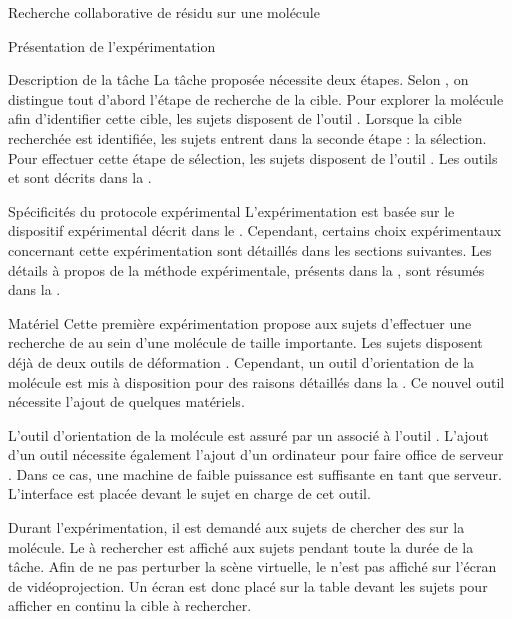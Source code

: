 \documentclass[myfrancais,ngerman,english,frenchb]{mythesis}
\begin{document}
\begin{mychapter}{Recherche collaborative de résidu sur une molécule}
\begin{mysection}{Présentation de l'expérimentation}
\begin{mysubsection}{Description de la tâche}
				La tâche proposée nécessite deux étapes.
				Selon , on distingue tout d'abord l'étape de recherche de la cible.
				Pour explorer la molécule afin d'identifier cette cible, les sujets disposent de l'outil .
				Lorsque la cible recherchée est identifiée, les sujets entrent dans la seconde étape : la sélection.
				Pour effectuer cette étape de sélection, les sujets disposent de l'outil .
				Les outils  et  sont décrits dans la .
			\end{mysubsection}
			\begin{mysubsection}{Spécificités du protocole expérimental}
				L'expérimentation est basée sur le dispositif expérimental décrit dans le .
				Cependant, certains choix expérimentaux concernant cette expérimentation sont détaillés dans les sections suivantes.
				Les détails à propos de la méthode expérimentale, présents dans la , sont résumés dans la .
				\begin{mysubsubsection}[sss-exp1-Materiel]{Matériel}
					Cette première expérimentation propose aux sujets d'effectuer une recherche de  au sein d'une molécule de taille importante.
					Les sujets disposent déjà de deux outils de déformation .
					Cependant, un outil d'orientation de la molécule est mis à disposition pour des raisons détaillés dans la .
					Ce nouvel outil nécessite l'ajout de quelques matériels.

					L'outil d'orientation de la molécule est assuré par un \myOmni associé à l'outil  .
					L'ajout d'un outil nécessite également l'ajout d'un ordinateur pour faire office de serveur .
					Dans ce cas, une machine de faible puissance est suffisante en tant que serveur.
					L'interface est placée devant le sujet en charge de cet outil.

					Durant l'expérimentation, il est demandé aux sujets de chercher des  sur la molécule.
					Le  à rechercher est affiché aux sujets pendant toute la durée de la tâche.
					Afin de ne pas perturber la scène virtuelle, le  n'est pas affiché sur l'écran de vidéoprojection.
					Un écran \myLCD {} est donc placé sur la table devant les sujets pour afficher en continu la cible à rechercher.


\end{mysubsubsection}
\end{mysubsection}
\end{mysection}
\end{mychapter}
\end{document}
